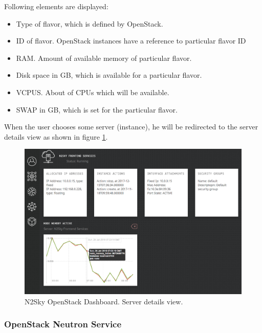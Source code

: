 \begin{description}
Following elements are displayed: 
\begin{itemize}
\item Type of flavor, which is defined by OpenStack.
\item ID of flavor. OpenStack instances have a reference to particular flavor ID
\item RAM. Amount of available memory of particular flavor. 
\item Disk space in GB, which is available for a particular flavor. 
\item VCPUS. About of CPUs which will be available. 
\item SWAP in GB, which is set for the particular flavor.
\end{itemize}

\end{description}

When the user chooses some server (instance), he will be redirected to the server details view as shown in figure \ref{fig:openstack_server_details}.

 \begin{figure}[H]
\begin{center}
  \includegraphics[width=\linewidth]{components/4/pics/openstack_server_details.png}
  \caption{N2Sky OpenStack Dashboard. Server details view.}
  \label{fig:openstack_server_details}
\end{center}
\end{figure}

\subsubsection{OpenStack Neutron Service}\label{OpenStack Neutron Service}

